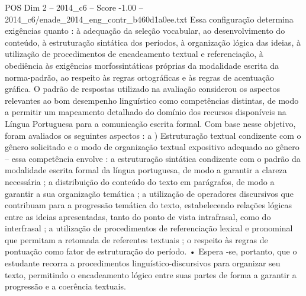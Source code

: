\begin{textsample}{POS Dim 2 – 2014\_c6 – Score -1.00 – 2014\_c6/enade\_2014\_eng\_contr\_b460d1a0ee.txt}
Essa configuração determina exigências quanto : à adequação da seleção vocabular, ao desenvolvimento do conteúdo, à estruturação sintática dos períodos, à organização lógica das ideias, à utilização de procedimentos de encadeamento textual e referenciação, à obediência às exigências morfossintáticas próprias da modalidade escrita da norma-padrão, ao respeito às regras ortográficas e às regras de acentuação gráfica.
O padrão de respostas utilizado na avaliação considerou os aspectos relevantes ao bom desempenho linguístico como competências distintas, de modo a permitir um mapeamento detalhado do domínio dos recursos disponíveis na Língua Portuguesa para a comunicação escrita formal.
Com base nesse objetivo, foram avaliados os seguintes aspectos : a ) Estruturação textual condizente com o gênero solicitado e o modo de organização textual expositivo adequado ao gênero – essa competência envolve : a estruturação sintática condizente com o padrão da modalidade escrita formal da língua portuguesa, de modo a garantir a clareza necessária ; a distribuição do conteúdo do texto em parágrafos, de modo a garantir a sua organização temática ; a utilização de operadores discursivos que contribuam para a progressão temática do texto, estabelecendo relações lógicas entre as ideias apresentadas, tanto do ponto de vista intrafrasal, como do interfrasal ; a utilização de procedimentos de referenciação lexical e pronominal que permitam a retomada de referentes textuais ; o respeito às regras de pontuação como fator de estruturação do período. • Espera -se, portanto, que o estudante recorra a procedimentos linguístico-discursivos para organizar seu texto, permitindo o encadeamento lógico entre suas partes de forma a garantir a progressão e a coerência textuais.

\end{textsample}
